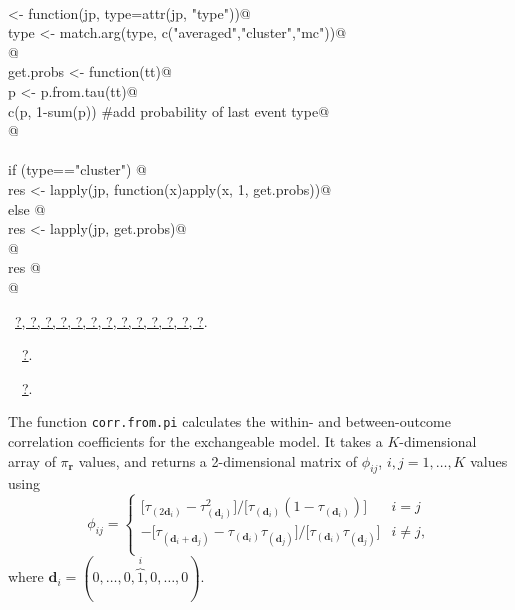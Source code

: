 \documentclass[reqno]{amsart}
\renewcommand{\NWlink}[2]{\hyperlink{#1}{#2}}
\newcommand{\rvec}{\mathbf{r}}
\newcommand{\dvec}{\mathbf{d}}
\begin{document}
\begin{flushleft}
\begin{list}{}{}
\mbox{}\verb@@\\
\mbox{}\verb@uniprobs <- function(jp, type=attr(jp, "type")){@\\
\mbox{}\verb@  type <- match.arg(type, c("averaged","cluster","mc"))@\\
\mbox{}\verb@  @\\
\mbox{}\verb@  get.probs <- function(tt){@\\
\mbox{}\verb@    p <- p.from.tau(tt)@\\
\mbox{}\verb@    c(p, 1-sum(p)) #add probability of last event type@\\
\mbox{}\verb@  }@\\
\mbox{}\verb@@\\
\mbox{}\verb@  if (type=="cluster") {@\\
\mbox{}\verb@    res <- lapply(jp, function(x)apply(x, 1, get.probs))@\\
\mbox{}\verb@  } else {@\\
\mbox{}\verb@    res <- lapply(jp, get.probs)@\\
\mbox{}\verb@  }@\\
\mbox{}\verb@  res  @\\
\mbox{}\verb@}@\\
\mbox{}\verb@@{\NWsep}
\end{list}
\vspace{-1.5ex}
\footnotesize
\begin{list}{}{\setlength{\itemsep}{-\parsep}\setlength{\itemindent}{-\leftmargin}}
\item \NWtxtFileDefBy\ \NWlink{nuweb?}{?}\NWlink{nuweb?}{, ?}\NWlink{nuweb?}{, ?}\NWlink{nuweb?}{, ?}\NWlink{nuweb?}{, ?}\NWlink{nuweb?}{, ?}\NWlink{nuweb?}{, ?}\NWlink{nuweb?}{, ?}\NWlink{nuweb?}{, ?}\NWlink{nuweb?}{, ?}\NWlink{nuweb?}{, ?}\NWlink{nuweb?}{, ?}\NWlink{nuweb?}{, ?}.
\item \NWtxtIdentsDefed\nobreak\  \verb@uniprobs@\nobreak\ \NWlink{nuweb?}{?}.\item \NWtxtIdentsUsed\nobreak\  \verb@tau@\nobreak\ \NWlink{nuweb?}{?}.
\item{}
\end{list}
\vspace{4ex}
\end{flushleft}
The function \texttt{corr.from.pi} calculates the within- and between-outcome correlation coefficients for the
exchangeable model. It takes a $K$-dimensional array of $\pi_\rvec$ values, and returns a 2-dimensional
matrix of $\phi_{ij}$, $i,j=1, \ldots,K$ values using
\begin{equation} 
 \phi_{ij} = 
   \begin{cases}
   \big[\tau_{(2\dvec_i)} - \tau_{(\dvec_i)}^2\big]\big/\big[\tau_{(\dvec_i)} (1-\tau_{(\dvec_i)})\big] & i=j\\
  -\big[\tau_{(\dvec_i+\dvec_j)} - \tau_{(\dvec_i)}\tau_{(\dvec_j)}\big]\big/\big[\tau_{(\dvec_i)} \tau_{(\dvec_j)}\big] & i\ne j,\\
   \end{cases} 
\end{equation}
where $\dvec_i=(0,\ldots,0,\overbrace{1}^i,0,\ldots,0)$.
\end{document}
